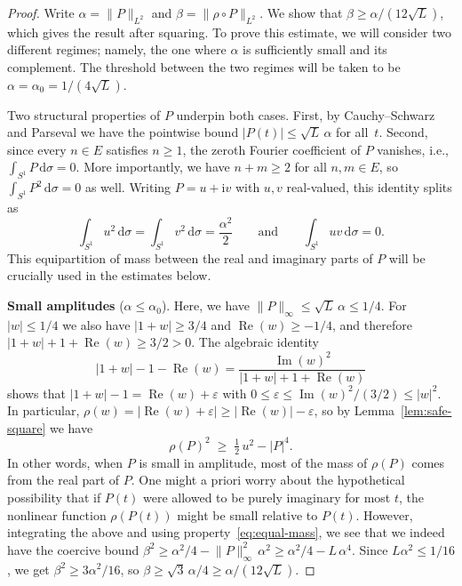 \documentclass[11pt]{amsart}
\theoremstyle{remark}
\begin{document}
\begin{proof}
Write $\alpha = \lVert P \rVert_{L^2}$ and $\beta = \lVert \rho \circ P \rVert_{L^2}$.
We show that $\beta \ge \alpha/(12\sqrt{L})$, which gives the result after
squaring. To prove this estimate, we will consider two different regimes; namely, the one where $\alpha$ is sufficiently small and its complement. The threshold between the two regimes will be taken to be
$\alpha=\alpha_0 = 1/(4\sqrt{L})$.
\medskip

Two structural properties of $P$ underpin both cases.  First,
by Cauchy--Schwarz and Parseval we have the pointwise bound
$\lvert P(t) \rvert \le \sqrt{L}\, \alpha$ for all~$t$.
Second, since every $n \in E$ satisfies $n \ge 1$, the zeroth Fourier
coefficient of $P$ vanishes, i.e.,
$\int_{S^1} P\,\mathrm{d}\sigma = 0$.
More importantly, we have $n + m \ge 2$ for all $n, m \in E$, so
$\int_{S^1} P^2\,\mathrm{d}\sigma = 0$ as well.  Writing $P = u + \mathrm{i} v$ with
$u, v$ real-valued, this identity splits as
\begin{equation}\label{eq:equal-mass}
\int_{S^1} u^2\,\mathrm{d}\sigma
= \int_{S^1} v^2\,\mathrm{d}\sigma
= \frac{\alpha^2}{2}
\qquad\text{and}\qquad
\int_{S^1} uv\,\mathrm{d}\sigma = 0.
\end{equation}
This equipartition of mass between the real and imaginary parts of $P$ will be crucially used in the estimates below.
\medskip

\noindent
\textbf{Small amplitudes} ($\alpha \le \alpha_0$).
Here, we have $\lVert P \rVert_\infty \le \sqrt{L}\,\alpha \le 1/4$.  For $\lvert w \rvert \le 1/4$
we also have $\lvert 1+w \rvert \ge 3/4$ and $\operatorname{Re}(w) \ge -1/4$, and therefore
$\lvert 1+w \rvert + 1 + \operatorname{Re}(w) \ge 3/2 > 0$.  The algebraic identity
\[
\lvert 1+w \rvert - 1 - \operatorname{Re}(w)
= \frac{\operatorname{Im}(w)^2}{\lvert 1+w \rvert + 1 + \operatorname{Re}(w)}
\]
shows that $\lvert 1+w \rvert - 1 = \operatorname{Re}(w) + \varepsilon$ with
$0 \le \varepsilon \le \operatorname{Im}(w)^2/(3/2) \le \lvert w \rvert^2$.  In particular,
$\rho(w) = \bigl\lvert \operatorname{Re}(w) + \varepsilon\bigr\rvert \ge
\lvert \operatorname{Re}(w) \rvert - \varepsilon$, so by 
Lemma~\ref{lem:safe-square} we have
\[
\rho(P)^2 \;\ge\; \tfrac{1}{2}\, u^2 - \lvert P \rvert^4.
\]
In other words, when $P$ is small in amplitude, most of the mass of $\rho(P)$ comes from the real part of $P$. One might a priori worry about the hypothetical possibility that if $P(t)$ were allowed to be purely imaginary for most $t$, the nonlinear function $\rho(P(t))$ might be small relative to $P(t)$. However, integrating the above and using property~\eqref{eq:equal-mass}, we see that we indeed have the coercive bound
$\beta^2 \ge \alpha^2/4 - \lVert P \rVert_\infty^2\, \alpha^2 \ge \alpha^2/4 - L\,\alpha^4$.
Since $L\alpha^2 \le 1/16$, we get $\beta^2 \ge 3\alpha^2/16$, so
$\beta \ge \sqrt{3}\,\alpha/4 \ge \alpha/(12\sqrt{L})$.


\end{proof}
\end{document}

